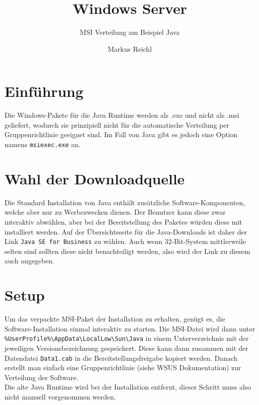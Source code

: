 \documentclass{preset/school}
\title{Windows Server}
\subtitle{MSI Verteilung am Beispiel Java}
\author{Markus Reichl}
\begin{document}
\maketitle

\section{Einführung}
Die Windows-Pakete für die Java Runtime werden als .exe und nicht als .msi geliefert, wodurch sie prinzipiell nicht für die automatische Verteilung per Gruppenrichtlinie geeignet sind.
Im Fall von Java gibt es jedoch eine Option namens \texttt{msiexec.exe} an.

\section{Wahl der Downloadquelle}
Die Standard Installation von Java enthält zusätzliche Software-Komponenten, welche aber nur zu Werbezwecken dienen.
Der Benutzer kann diese zwar interaktiv abwählen, aber bei der Bereitstellung des Paketes würden diese mit installiert werden.
Auf der Übersichtsseite für die Java-Downloads ist daher der Link \texttt{Java SE for Business} zu wählen.
Auch wenn 32-Bit-System mittlerweile selten sind sollten diese nicht benachteiligt werden, also wird der Link zu diesem auch angegeben.

\section{Setup}
Um das verpackte MSI-Paket der Installation zu erhalten, genügt es, die Software-Installation einmal interaktiv zu starten.
Die MSI-Datei wird dann unter\\ \texttt{\%UserProfile\%\textbackslash{}AppData\textbackslash{}LocalLow\textbackslash{}Sun\textbackslash{}Java} in einem Unterverzeichnis mit der jeweiligen Versionsbezeichnung gespeichert.
Diese kann dann zusammen mit der Datendatei \texttt{Data1.cab} in die Bereitstellungsfreigabe kopiert werden. Danach erstellt man einfach eine Gruppenrichtlinie (siehe WSUS Dokumentation) zur Verteilung der Software.
\\
Die alte Java Runtime wird bei der Installation entfernt, dieser Schritt muss also nicht manuell vorgenommen werden.
\end{document}
